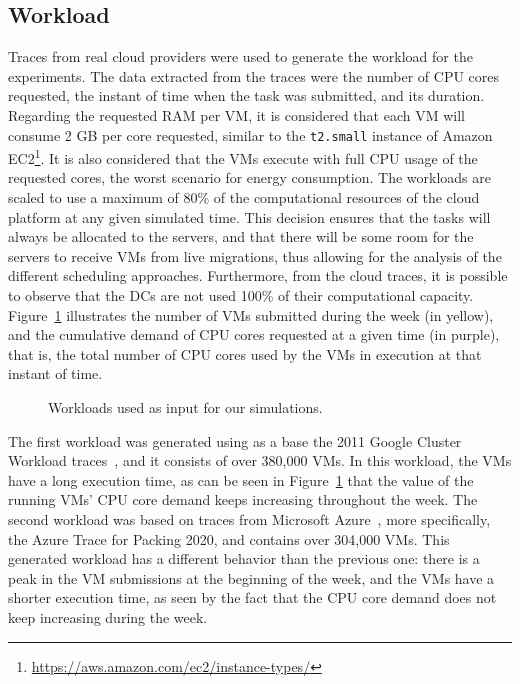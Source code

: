 \subsection{Workload}

Traces from real cloud providers were used to generate the workload for the experiments. The data extracted from the traces were the number of CPU cores requested, the instant of time when the task was submitted, and its duration. Regarding the requested RAM per VM, it is considered that each VM will consume 2 GB per core requested, similar to the \texttt{t2.small} instance of Amazon EC2\footnote{\url{https://aws.amazon.com/ec2/instance-types/}}. It is also considered that the VMs execute with full CPU usage of the requested cores, the worst scenario for energy consumption. The workloads are scaled to use a maximum of 80\% of the computational resources of the cloud platform at any given simulated time. This decision ensures that the tasks will always be allocated to the servers, and that there will be some room for the servers to receive VMs from live migrations, thus allowing for the analysis of the different scheduling approaches. Furthermore, from the cloud traces, it is possible to observe that the DCs are not used 100\% of their computational capacity. Figure~\ref{fig:workload} illustrates the number of VMs submitted during the week (in yellow), and the cumulative demand of CPU cores requested at a given time (in purple), that is, the total number of CPU cores used by the VMs in execution at that instant of time.

\begin{figure}[!htbp]
  \centering
   {}
  \caption{Workloads used as input for our simulations.}
  \label{fig:workload}
 \end{figure}

The first workload was generated using as a base the 2011 Google Cluster Workload traces~\cite{google2011traces}, and it consists of over 380,000 VMs. In this workload, the VMs have a long execution time, as can be seen in Figure~\ref{fig:workload} that the value of the running VMs' CPU core demand keeps increasing throughout the week. The second workload was based on traces from Microsoft Azure~\cite{hadary2020protean}, more specifically, the Azure Trace for Packing 2020, and contains over 304,000 VMs. This generated workload has a different behavior than the previous one: there is a peak in the VM submissions at the beginning of the week, and the VMs have a shorter execution time, as seen by the fact that the CPU core demand does not keep increasing during the week.

